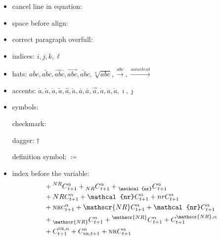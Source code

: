 \documentclass[
thesis.tex
]{subfiles}
\begin{document}
\begin{itemize}
	
	\item cancel line in equation: 
	
	
	\item space before align:  %
	
	\item correct paragraph overfull: 
	
	\item indices: $i,j,k,\ell$
	
	\item hats: \( \overline{abc}, \widetilde{abc}, \widehat{abc}, \overrightarrow{abc}, \overleftarrow{abc}, \sqrt[n]{abc}, \xrightarrow{abc}, \xrightarrow{some text}\)
	
	\item accents: \(\acute{a}, \check{a}, \grave{a}, \widetilde{a}, \hat{a}, \breve{a}, \overline{a}, \bar{a}, \vec{a}, \dot{a}, \ddot{a}, \mathring{a}, \imath, \jmath\)
	
	\item symbols:
	
	checkmark: \checkmark 
	
	dagger: $\dagger$
	
	definition symbol: $\coloneq$
	
	\item index before the variable:
	\begin{align*}
		& + \prescript{NR}{}{C}^{\alpha}_{t+1} + \prescript{}{NR}{C}^{\alpha}_{t+1} + \prescript{}{\mathcal{nr}}{C}^{\alpha}_{t+1}        
		\\
		& + NRC^{\alpha}_{t+1} + \mathcal{nr}C^{\alpha}_{t+1} + nrC^{\alpha}_{t+1}
		\\
		& + \textsc{nrc}^{\alpha}_{t+1} + \mathscr{NR}C^{\alpha}_{t+1} + \mathcal{nr}C^{\alpha}_{t+1}
		\\
		& + \prescript{}{\mathscr{NR}}{C}^{\alpha}_{t+1} + \prescript{\mathscr{NR}}{}{C}^{\alpha}_{t+1} + {C}^{\mathscr{NR},\alpha}_{t+1} 
		\\
		& + {C}^{\textsc{nr},\alpha}_{t+1} + {C}^{\alpha}_{\textsc{nr},t+1} + \textsc{nr}C^{\alpha}_{t+1}
	\end{align*}
	

\end{itemize}
\end{document}
